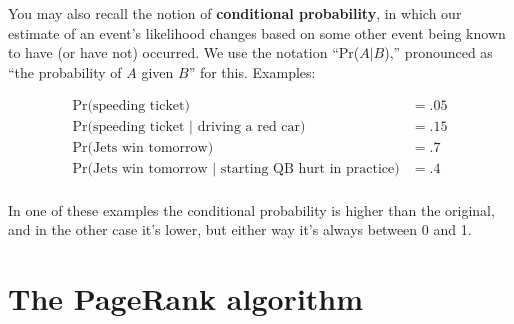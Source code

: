 \begin{alttitles}
You may also recall the notion of \textbf{conditional probability}, in which
our estimate of an event's likelihood changes based on some other event being
known to have (or have not) occurred. We use the notation ``Pr($A|B$),''
pronounced as ``the probability of $A$ given $B$'' for this. Examples:

\vspace{-.15in}
\begin{align*}
\textrm{Pr(speeding ticket)} &= .05 \\
\textrm{Pr(speeding ticket\ $|$\ driving a red car)} &= .15 \\[12pt]
\textrm{Pr(Jets win tomorrow)} &= .7 \\
\textrm{Pr(Jets win tomorrow\ $|$\ starting QB hurt in practice)} &= .4 \\
\end{align*}
\vspace{-.15in}

In one of these examples the conditional probability is higher than the
original, and in the other case it's lower, but either way it's always between
0 and 1.

\vfill
\pagebreak

\renewcommand{\thesubsection}{P\arabic{subsection}.}%
\section{The PageRank algorithm}

\end{alttitles}

